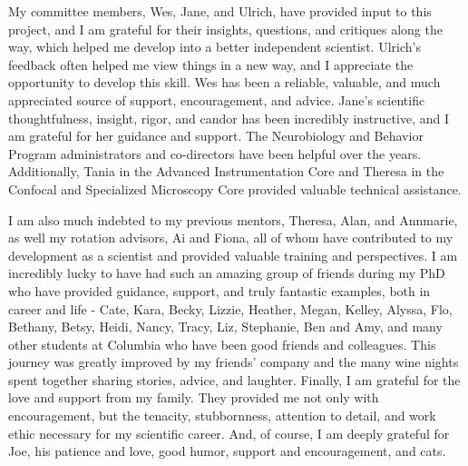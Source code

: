 My committee members, Wes, Jane, and Ulrich, have provided input to this project, and I am grateful for their insights, questions, and critiques along the way, which helped me develop into a better independent scientist.
Ulrich's feedback often helped me view things in a new way, and I appreciate the opportunity to develop this skill. 
Wes has been a reliable, valuable, and much appreciated source of support, encouragement, and advice.
Jane's scientific thoughtfulness, insight, rigor, and candor has been incredibly instructive, and I am grateful for her guidance and support.
The Neurobiology and Behavior Program administrators and co-directors have been helpful over the years.
Additionally, Tania in the Advanced Instrumentation Core and Theresa in the Confocal and Specialized Microscopy Core provided valuable technical assistance.

I am also much indebted to my previous mentors, Theresa, Alan, and Annmarie, as well my rotation advisors, Ai and Fiona, all of whom have contributed to my development as a scientist and provided valuable training and perspectives.
I am incredibly lucky to have had such an amazing group of friends during my PhD who have provided guidance, support, and truly fantastic examples, both in career and life - Cate, Kara, Becky, Lizzie, Heather, Megan, Kelley, Alyssa, Flo, Bethany, Betsy, Heidi, Nancy, Tracy, Liz, Stephanie, Ben and Amy, and many other students at Columbia who have been good friends and colleagues.
This journey was greatly improved by my friends' company and the many wine nights spent together sharing stories, advice, and laughter.
Finally, I am grateful for the love and support from my family.
They provided me not only with encouragement, but the tenacity, stubbornness, attention to detail, and work ethic necessary for my scientific career.
And, of course, I am deeply grateful for Joe, his patience and love, good humor, support and encouragement, and cats.